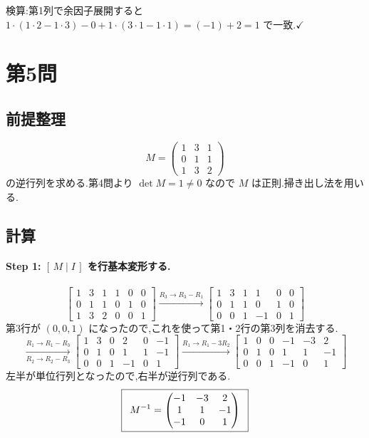 \documentclass[11pt,a4paper]{article}
\begin{document}
検算:第1列で余因子展開すると
$1\cdot(1\cdot2-1\cdot3)-0+1\cdot(3\cdot1-1\cdot1)=(-1)+2=1$ で一致.$\checkmark$

\section*{第5問}

\subsection*{前提整理}

\[
M=\begin{pmatrix}1&3&1\\0&1&1\\1&3&2\end{pmatrix}
\]
の逆行列を求める.第4問より $\det M=1\neq0$ なので $M$ は正則.掃き出し法を用いる.

\subsection*{計算}

\paragraph{Step 1: $[\,M\mid I\,]$ を行基本変形する.}
\[
\left[\begin{array}{ccc|ccc}
1&3&1&1&0&0\\0&1&1&0&1&0\\1&3&2&0&0&1
\end{array}\right]
\xrightarrow{R_3\to R_3-R_1}
\left[\begin{array}{ccc|ccc}
1&3&1&1&0&0\\0&1&1&0&1&0\\0&0&1&-1&0&1
\end{array}\right]
\]
第3行が $(0,0,1)$ になったので,これを使って第1・2行の第3列を消去する.
\[
\xrightarrow[R_2\to R_2-R_3]{R_1\to R_1-R_3}
\left[\begin{array}{ccc|ccc}
1&3&0&2&0&-1\\0&1&0&1&1&-1\\0&0&1&-1&0&1
\end{array}\right]
\xrightarrow{R_1\to R_1-3R_2}
\left[\begin{array}{ccc|ccc}
1&0&0&-1&-3&2\\0&1&0&1&1&-1\\0&0&1&-1&0&1
\end{array}\right]
\]
左半が単位行列となったので,右半が逆行列である.
\[
\ans{\
M^{-1}=\begin{pmatrix}-1&-3&2\\1&1&-1\\-1&0&1\end{pmatrix}\ }
\]
\end{document}
